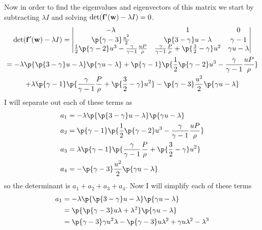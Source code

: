 \documentclass[11pt, oneside]{article}
\begin{document}
\begin{enumerate}
    Now in order to find the eigenvalues and eigenvectors of this matrix we
    start by subtracting $\lambda I$ and solving
    $\det(\mathbf{f}'(\mathbf{w}) - \lambda I) = 0$.
    \begin{gather*}
      \det(\v{f}'(\v{w}) - \lambda I) =
      \begin{vmatrix}
        -\lambda & 1 & 0 \\
        \p{\gamma - 3} \frac{u^2}{2} & \p{3 - \gamma}u - \lambda & \gamma - 1 \\
        \frac{1}{2}\p{\gamma - 2} u^3 - \frac{\gamma}{\gamma - 1}\frac{uP}{\rho} & \frac{\gamma}{\gamma - 1}\frac{P}{\rho} + \p{\frac{3}{2} - \gamma}u^2  & \gamma u - \lambda \\
      \end{vmatrix} \\
      = -\lambda \p{\p{3 - \gamma}u - \lambda} \p{\gamma u - \lambda} + \p{\gamma - 1}\p{\frac{1}{2}\p{\gamma - 2} u^3 - \frac{\gamma}{\gamma - 1}\frac{uP}{\rho}} \\
      + \lambda \p{\gamma - 1} \p{\frac{\gamma}{\gamma - 1}\frac{P}{\rho} + \p{\frac{3}{2} - \gamma}u^2} - \p{\gamma - 3} \frac{u^2}{2}\p{\gamma u - \lambda}
    \end{gather*}
    I will separate out each of these terms as
    \begin{align*}
      a_1 &= -\lambda \p{\p{3 - \gamma}u - \lambda} \p{\gamma u - \lambda} \\
      a_2 &= \p{\gamma - 1}\p{\frac{1}{2}\p{\gamma - 2} u^3 - \frac{\gamma}{\gamma - 1}\frac{uP}{\rho}} \\
      a_3 &= \lambda \p{\gamma - 1} \p{\frac{\gamma}{\gamma - 1}\frac{P}{\rho} + \p{\frac{3}{2} - \gamma}u^2} \\
      a_4 &= -\p{\gamma - 3} \frac{u^2}{2}\p{\gamma u - \lambda}
    \end{align*}
    so the determinant is $a_1 + a_2 + a_3 + a_4$.
    Now I will simplify each of these terms
    \begin{align*}
      a_1 &=  -\lambda \p{\p{3 - \gamma}u - \lambda} \p{\gamma u - \lambda} \\
      &= \p{\p{\gamma - 3}u\lambda + \lambda^2} \p{\gamma u - \lambda} \\
      &= \p{\gamma - 3}\gamma u^2 \lambda - \p{\gamma - 3} u\lambda^2 + \gamma u \lambda^2 - \lambda^3 \\

\end{align*}
\end{enumerate}
\end{document}
